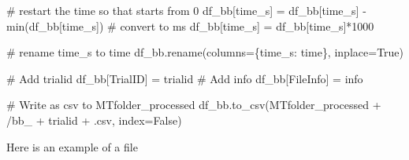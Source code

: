 \documentclass[
  letterpaper,
  DIV=11,
  numbers=noendperiod]{scrreprt}
\newenvironment{Shaded}{\begin{snugshade}}{\end{snugshade}}
\newcommand{\BuiltInTok}[1]{\textcolor[rgb]{0.00,0.23,0.31}{#1}}
\newcommand{\CommentTok}[1]{\textcolor[rgb]{0.37,0.37,0.37}{#1}}
\newcommand{\DecValTok}[1]{\textcolor[rgb]{0.68,0.00,0.00}{#1}}
\newcommand{\NormalTok}[1]{\textcolor[rgb]{0.00,0.23,0.31}{#1}}
\newcommand{\OperatorTok}[1]{\textcolor[rgb]{0.37,0.37,0.37}{#1}}
\newcommand{\StringTok}[1]{\textcolor[rgb]{0.13,0.47,0.30}{#1}}
\newcommand{\VariableTok}[1]{\textcolor[rgb]{0.07,0.07,0.07}{#1}}
\begin{document}
\begin{Shaded}
\begin{Highlighting}[]
    \CommentTok{\# restart the time so that starts from 0}
\NormalTok{    df\_bb[}\StringTok{\textquotesingle{}time\_s\textquotesingle{}}\NormalTok{] }\OperatorTok{=}\NormalTok{ df\_bb[}\StringTok{\textquotesingle{}time\_s\textquotesingle{}}\NormalTok{] }\OperatorTok{{-}} \BuiltInTok{min}\NormalTok{(df\_bb[}\StringTok{\textquotesingle{}time\_s\textquotesingle{}}\NormalTok{])}
    \CommentTok{\# convert to ms}
\NormalTok{    df\_bb[}\StringTok{\textquotesingle{}time\_s\textquotesingle{}}\NormalTok{] }\OperatorTok{=}\NormalTok{ df\_bb[}\StringTok{\textquotesingle{}time\_s\textquotesingle{}}\NormalTok{]}\OperatorTok{*}\DecValTok{1000}

    \CommentTok{\# rename time\_s to time}
\NormalTok{    df\_bb.rename(columns}\OperatorTok{=}\NormalTok{\{}\StringTok{\textquotesingle{}time\_s\textquotesingle{}}\NormalTok{: }\StringTok{\textquotesingle{}time\textquotesingle{}}\NormalTok{\}, inplace}\OperatorTok{=}\VariableTok{True}\NormalTok{)}

    \CommentTok{\# Add trialid}
\NormalTok{    df\_bb[}\StringTok{\textquotesingle{}TrialID\textquotesingle{}}\NormalTok{] }\OperatorTok{=}\NormalTok{ trialid}
    \CommentTok{\# Add info}
\NormalTok{    df\_bb[}\StringTok{\textquotesingle{}FileInfo\textquotesingle{}}\NormalTok{] }\OperatorTok{=}\NormalTok{ info}

    \CommentTok{\# Write as csv to MTfolder\_processed}
\NormalTok{    df\_bb.to\_csv(MTfolder\_processed }\OperatorTok{+} \StringTok{\textquotesingle{}/bb\_\textquotesingle{}} \OperatorTok{+}\NormalTok{ trialid }\OperatorTok{+} \StringTok{\textquotesingle{}.csv\textquotesingle{}}\NormalTok{, index}\OperatorTok{=}\VariableTok{False}\NormalTok{)}
\end{Highlighting}
\end{Shaded}

Here is an example of a file
\end{document}

